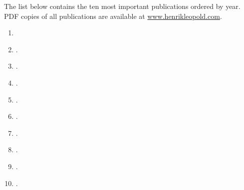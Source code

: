 

The list below contains the ten most important publications ordered by year. PDF copies of all publications are available at \href{http://www.henrikleopold.com}{www.henrikleopold.com}.


\begin{enumerate}
\item {}
\item {}.
\item {}.
\item {}.
\item {}.
\item {}.
\item {}.
\item {}.
\item {}.
\item {}.
\end{enumerate}

